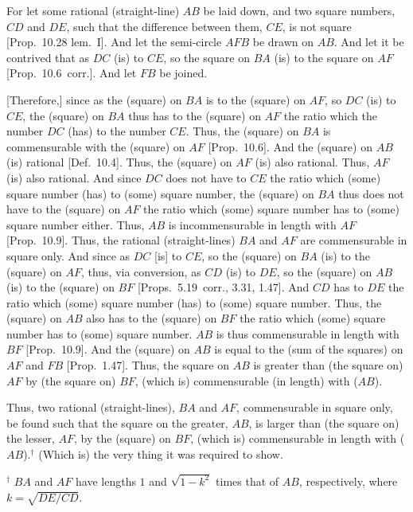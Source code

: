 \begin{Parallel}{}{}
{\epsfysize=1.7in
\centerline{}

For let some rational (straight-line) $AB$ be laid down, and two
square numbers, $CD$ and $DE$, such that the difference between them, $CE$, is not square [Prop.~10.28 lem.~I]. 
And let the semi-circle $AFB$ be drawn on $AB$. And let
it be contrived that as $DC$ (is) to $CE$, so the square on $BA$
(is) to the square on $AF$ [Prop.~10.6~corr.].
And let $FB$ be joined.

\mbox{[}Therefore,] since as the (square) on $BA$ is to the (square) on $AF$,
so $DC$ (is) to $CE$, the (square) on $BA$ thus has to the (square)
on $AF$ the ratio which the number $DC$ (has) to the number $CE$.
Thus, the (square) on $BA$ is commensurable with the (square) on $AF$
[Prop.~10.6]. And the (square) on $AB$ (is)
rational [Def.~10.4]. Thus, the (square) on $AF$
(is) also rational. Thus, $AF$ (is) also rational. 
And since $DC$ does not have to $CE$ the ratio which
(some) square number (has) to (some) square number,  the (square)
on $BA$ thus does not have to the (square) on $AF$ the ratio which (some)
square number has to (some) square number either. Thus, $AB$ is incommensurable in length with $AF$ [Prop.~10.9].
Thus, the rational (straight-lines) $BA$
and $AF$ are commensurable in square only. And since as $DC$ [is] to $CE$, so the
(square) on $BA$ (is) to the (square) on $AF$, thus, via conversion,
as $CD$ (is) to $DE$, so the (square) on $AB$ (is) to the (square) on
$BF$ [Props.~5.19~corr., 3.31, 1.47]. And $CD$
has to $DE$ the ratio which (some) square number (has) to (some)
square number. Thus, the (square) on $AB$ also has to the (square) on
$BF$ the ratio which (some) square number has to (some) square number.
$AB$ is thus commensurable in length with $BF$ [Prop.~10.9]. And the (square) on $AB$
is equal to the (sum of the squares) on $AF$ and $FB$ [Prop.~1.47]. Thus, the
square on $AB$ is greater than (the square on) $AF$ by (the square on)
$BF$, (which is) commensurable (in length) with ($AB$).

Thus, two rational (straight-lines), $BA$ and $AF$, commensurable in square only, be found such that the square on the greater, $AB$, is larger
than (the square on) the lesser, $AF$, by the (square) on $BF$, (which is)
commensurable in length with ($AB$).$^\dag$ (Which is) the very thing it
was required to show.}
\end{Parallel}
{\footnotesize\noindent$^\dag$ $BA$ and $AF$
have lengths $1$ and $\sqrt{1-k^2}$ times that of $AB$, respectively, where $k=\sqrt{DE/CD}$.}

